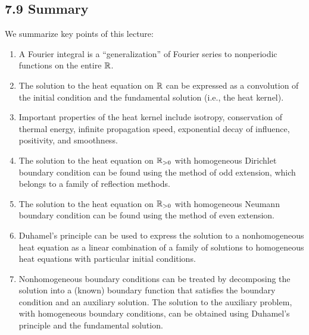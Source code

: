 
\subsection{7.9 Summary}
We summarize key points of this lecture:
\begin{enumerate}
    \item A Fourier integral is a ``generalization'' of Fourier series to nonperiodic functions on the entire $\mathbb{R}$.
    \item The solution to the heat equation on $\mathbb{R}$ can be expressed as a convolution of the initial condition and the fundamental solution (i.e., the heat kernel).
    \item Important properties of the heat kernel include isotropy, conservation of thermal energy, infinite propagation speed, exponential decay of influence, positivity, and smoothness.
    \item The solution to the heat equation on $\mathbb{R}_{>0}$ with homogeneous Dirichlet boundary condition can be found using the method of odd extension, which belongs to a family of reflection methods.
    \item The solution to the heat equation on $\mathbb{R}_{>0}$ with homogeneous Neumann boundary condition can be found using the method of even extension.
    \item Duhamel's principle can be used to express the solution to a nonhomogeneous heat equation as a linear combination of a family of solutions to homogeneous heat equations with particular initial conditions.
    \item Nonhomogeneous boundary conditions can be treated by decomposing the solution into a (known) boundary function that satisfies the boundary condition and an auxiliary solution. The solution to the auxiliary problem, with homogeneous boundary conditions, can be obtained using Duhamel's principle and the fundamental solution.
\end{enumerate}

